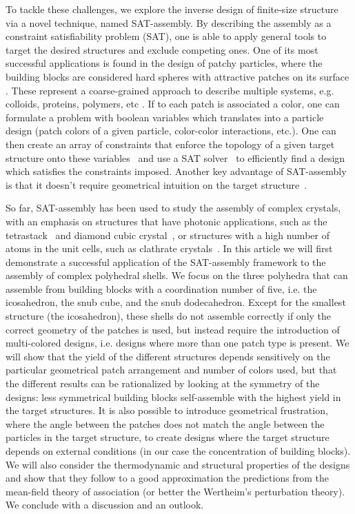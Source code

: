 \documentclass[a4paper, amsfonts, amssymb, amsmath, reprint, showkeys, nofootinbib, twoside]{revtex4-1}
\begin{document}
To tackle these challenges, we explore the inverse design of finite-size structure via a novel technique, named SAT-assembly\cite{Romano2020a,Russo2022}. By describing the assembly as a constraint satisfiability problem (SAT), one is able to apply general tools to target the desired structures and exclude competing ones. One of its most successful applications is found in the design of patchy particles, where the building blocks are considered hard spheres with attractive patches on its surface \cite{Bianchi2006, Romano2010, Rovigatti2018, Russo2021, Sciortino2009}. These represent a coarse-grained approach to describe multiple systems, e.g. colloids, proteins, polymers, etc \cite{Sacanna2011, Wang2012}. If to each patch is associated a color, one can formulate a problem with boolean variables which translates into a particle design (patch colors of a given particle, color-color interactions, etc.). One can then create an array of constraints that enforce the topology of a given target structure onto these variables~\cite{Russo2022} and use a SAT solver~\cite{Een2005} to efficiently find a design which satisfies the constraints imposed.
Another key advantage of SAT-assembly is that it doesn't require geometrical intuition on the target structure~\textcolor{blue}{\cite{rapaport2004self}}.


So far, SAT-assembly has been used to study the assembly of complex crystals, with an emphasis on structures that have photonic applications, such as the tetrastack~\cite{Romano2020a} and diamond cubic crystal~\textcolor{blue}{\cite{Romano2020a,Russo2022,rovigatti2022simple}}, or structures with a high number of atoms in the unit cells, such as clathrate crystals~\cite{Romano2020a}. In this article we will first demonstrate a successful application of the SAT-assembly framework to the assembly of complex polyhedral shells. We focus on the three polyhedra that can assemble from building blocks with a  coordination number of five, i.e. the icosahedron, the snub cube, and the snub dodecahedron. Except for the smallest structure (the icosahedron), these shells do not assemble correctly if only the correct geometry of the patches is used, but instead require the introduction of multi-colored designs, i.e. designs where more than one patch type is present. We will show that the yield of the different structures depends sensitively on the particular geometrical patch arrangement and number of colors used, but that the different results can be rationalized by looking at the symmetry of the designs: less symmetrical building blocks self-assemble with the highest yield in the target structures. It is also possible to introduce geometrical frustration, where the angle between the patches does not match the angle between the particles in the target structure, to create designs where the target structure depends on external conditions (in our case the concentration of building blocks). We will also consider the thermodynamic and structural properties of the designs and show that they follow to a good approximation the predictions from the mean-field theory of association (or better the Wertheim's perturbation theory). We conclude with a discussion and an outlook.
\end{document}
